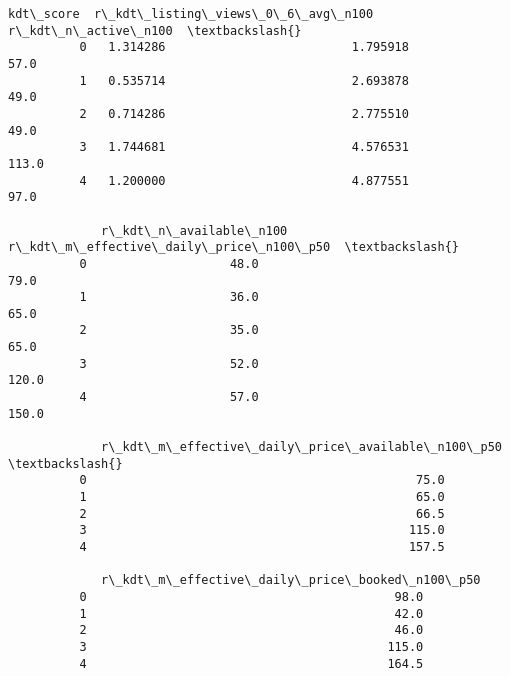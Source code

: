 \documentclass[11pt]{article}
\begin{document}
\begin{Verbatim}[commandchars=\\\{\}]
             kdt\_score  r\_kdt\_listing\_views\_0\_6\_avg\_n100  r\_kdt\_n\_active\_n100  \textbackslash{}
          0   1.314286                          1.795918                 57.0   
          1   0.535714                          2.693878                 49.0   
          2   0.714286                          2.775510                 49.0   
          3   1.744681                          4.576531                113.0   
          4   1.200000                          4.877551                 97.0   
          
             r\_kdt\_n\_available\_n100  r\_kdt\_m\_effective\_daily\_price\_n100\_p50  \textbackslash{}
          0                    48.0                                    79.0   
          1                    36.0                                    65.0   
          2                    35.0                                    65.0   
          3                    52.0                                   120.0   
          4                    57.0                                   150.0   
          
             r\_kdt\_m\_effective\_daily\_price\_available\_n100\_p50  \textbackslash{}
          0                                              75.0   
          1                                              65.0   
          2                                              66.5   
          3                                             115.0   
          4                                             157.5   
          
             r\_kdt\_m\_effective\_daily\_price\_booked\_n100\_p50  
          0                                           98.0  
          1                                           42.0  
          2                                           46.0  
          3                                          115.0  
          4                                          164.5  
\end{Verbatim}
            
\end{document}
